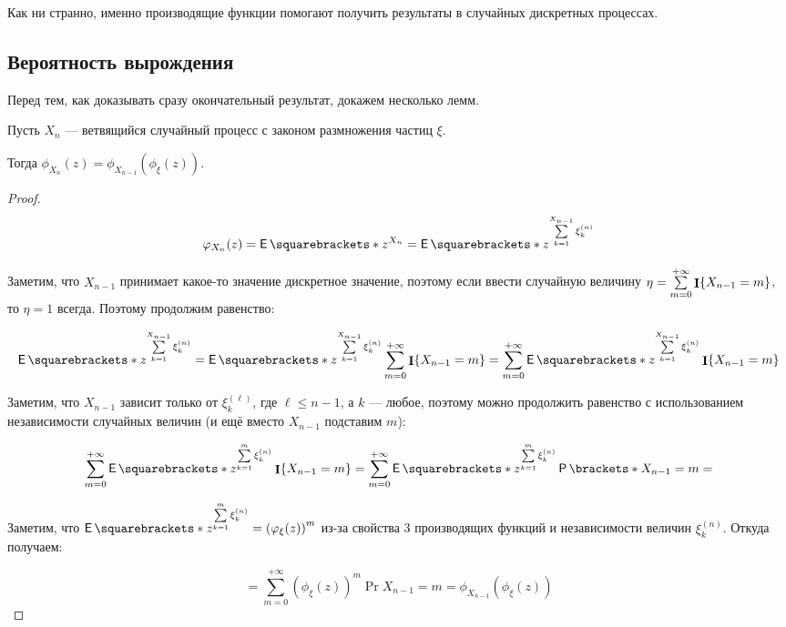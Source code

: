 Как ни странно, именно производящие функции помогают получить результаты в случайных
дискретных процессах.

\subsection{Вероятность вырождения}

Перед тем, как доказывать сразу окончательный результат, докажем несколько лемм.

\begin{lemma}[О зависимости $X_n$ и $X_{n - 1}$]
  Пусть $X_n$ --- ветвящийся случайный процесс с законом размножения частиц $\xi$.

  Тогда $\phi_{X_n}(z) = \phi_{X_{n - 1}}(\phi_\xi(z))$.
\end{lemma}

\begin{proof}
  \[
    \phi_{X_n}(z) = \E{z^{X_n}} = \E{z^{\sum\limits_{k = 1}^{X_{n - 1}} \xi_k^{(n)}}}
  \]

  Заметим, что $X_{n - 1}$ принимает какое-то значение дискретное значение,
  поэтому если ввести случайную величину $\eta = \sum\limits_{m = 0}^{+\infty} 
  \mathop{\mathbf{I}}\{X_{n - 1} = m\}$, то $\eta = 1$ всегда. Поэтому продолжим равенство:

  \[
    \E{z^{\sum\limits_{k = 1}^{X_{n - 1}} \xi_k^{(n)}}} =
    \E{z^{\sum\limits_{k = 1}^{X_{n - 1}} \xi_k^{(n)}} \sum\limits_{m = 0}^{+\infty} 
    \I\{X_{n - 1} = m\}} = \sum\limits_{m = 0}^{+\infty} \E{z^{\sum\limits_{k = 
    1}^{X_{n - 1}} \xi_k^{(n)}}\I\{X_{n - 1} = m\}}
  \]

  Заметим, что $X_{n - 1}$ зависит только от $\xi_k^{(\ell)}$, где $\ell \leq n - 1$,
  а $k$ --- любое, поэтому можно продолжить равенство с использованием
  независимости случайных величин (и ещё вместо $X_{n - 1}$
  подставим $m$):

  \[
    \sum\limits_{m = 0}^{+\infty} \E{z^{\sum\limits_{k = 1}^{m}
    \xi_k^{(n)}}\I\{X_{n - 1} = m\}} = \sum\limits_{m = 0}^{+\infty} \E{z^{\sum\limits_{k = 1}^{m}
    \xi_k^{(n)}}} \Pr{X_{n - 1} = m} = 
  \]

  Заметим, что $\E{z^{\sum\limits_{k = 1}^{m} \xi_k^{(n)}}} = 
  \left(\phi_{\xi}(z)\right)^m$ из-за свойства 3 производящих функций и независимости
  величин $\xi_k^{(n)}$. Откуда получаем:

  \[
    = \sum\limits_{m = 0}^{+\infty} \left(\phi_{\xi}(z)\right)^m \Pr{X_{n - 1} = m} =
    \phi_{X_{n - 1}}(\phi_{\xi}(z))
  \]
\end{proof}

